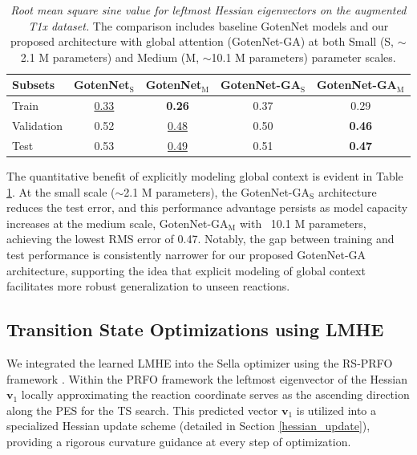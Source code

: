 \documentclass[12pt]{article}
\begin{document}
\begin{table}[H] 
    \centering
    \caption{\textit{Root mean square sine value for leftmost Hessian eigenvectors on the augmented T1x dataset.} The comparison includes baseline GotenNet models and our proposed architecture with global attention (GotenNet-GA) at both Small (S, $\sim$2.1 M parameters) and Medium (M, $\sim$10.1 M parameters) parameter scales.} \label{tab:loss}
    \begin{tabular}{lcccc}
        \toprule
         Subsets  & GotenNet$_{\text{S}}$ & GotenNet$_{\text{M}}$ & GotenNet-GA$_{\text{S}}$ & GotenNet-GA$_{\text{M}}$ \\
        \midrule
        Train  & \underline{0.33} & \textbf{0.26} & 0.37 & 0.29 \\
        Validation & 0.52 & \underline{0.48} & 0.50 & \textbf{0.46}  \\
        Test & 0.53 & \underline{0.49} & 0.51 & \textbf{0.47}  \\
         \bottomrule
     \end{tabular}
 \end{table}

The quantitative benefit of explicitly modeling global context is evident in Table \ref{tab:loss}. At the small scale ($\sim$2.1 M parameters), the  GotenNet-GA$_{\text{S}}$ architecture reduces the test error, and this performance advantage persists as model capacity increases at the medium scale, GotenNet-GA$_{\text{M}}$ with ~10.1 M parameters, achieving the lowest RMS error of 0.47. Notably, the gap between training and test performance is consistently narrower for our proposed GotenNet-GA architecture, supporting the idea that explicit modeling of global context facilitates more robust generalization to unseen reactions.\par

\subsection{Transition State Optimizations using LMHE}
We integrated the learned LMHE into the Sella optimizer \cite{Sella2} using the RS-PRFO framework \cite{prfo1, prfo2, prfo3}. Within the PRFO framework the leftmost eigenvector of the Hessian $\mathbf{v}_1$ locally approximating the reaction coordinate serves as the ascending direction along the PES for the TS search. This predicted vector $\mathbf{v}_1$ is utilized into a specialized Hessian update scheme (detailed in Section \ref{hessian_update}), providing a rigorous curvature guidance at every step of optimization.\par
\end{document}
